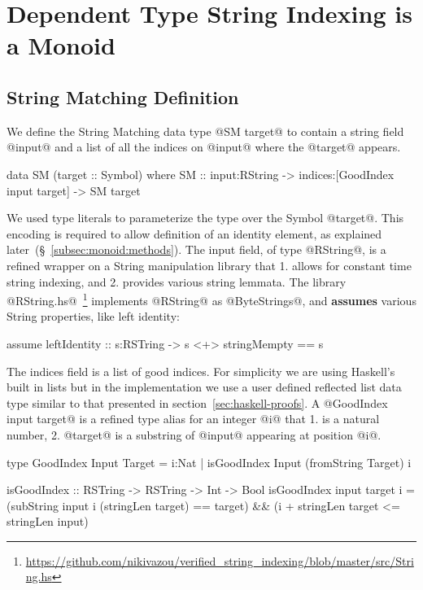\section{Dependent Type String Indexing is a Monoid}\label{sec:monoid}



\subsection{String Matching Definition}

We define the String Matching data type
@SM target@ to contain a string field @input@ and
a list of all the indices on @input@ where the
@target@ appears.
%
\begin{code}
data SM (target :: Symbol) where
  SM :: input:RString
     -> indices:[GoodIndex input target]
     -> SM target
\end{code}
%
We used type literals to parameterize the type over
the Symbol @target@.
%
This encoding is required to allow definition of
an identity element, as explained later~(\S~\ref{subsec:monoid:methods}).
%
The input field, of type @RString@, is a refined wrapper on
a String manipulation library that
1. allows for constant time string indexing, and
2. provides various string lemmata.
%
The library @RString.hs@~\footnote{
\href{https://github.com/nikivazou/verified_string_indexing/blob/master/src/String.hs}
     {\url{https://github.com/nikivazou/verified_string_indexing/blob/master/src/String.hs}}}
implements @RString@ as @ByteStrings@,
and \textbf{assumes} various String properties,
like left identity:
\begin{code}
assume leftIdentity :: s:RSTring -> { s <+> stringMempty == s }
\end{code}
%
The indices field is a list of good indices.
%
For simplicity we are using Haskell's built in lists but in the
implementation we use a user defined reflected list data type similar
to that presented in section~\ref{sec:haskell-proofs}.
%
A @GoodIndex input target@ is a refined type alias
for an integer @i@ that
1. is a natural number,
2. @target@ is a substring of @input@ appearing at position @i@.
%
\begin{code}
type GoodIndex Input Target
  = {i:Nat | isGoodIndex Input (fromString Target) i }

isGoodIndex :: RSTring -> RSTring -> Int -> Bool
isGoodIndex input target i
  =  (subString input i (stringLen target)  == target)
  && (i + stringLen target <= stringLen input)
\end{code}
%

